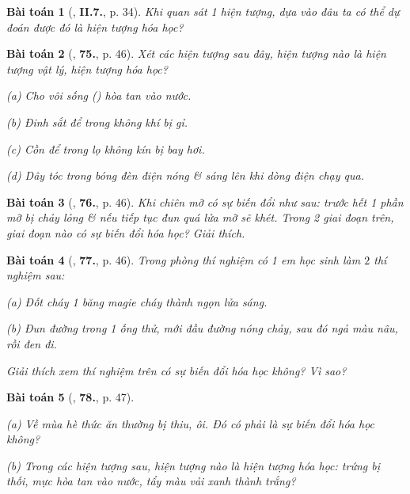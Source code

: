 \documentclass{article}
\numberwithin{equation}{section}
\newtheorem{baitoan}{Bài toán}
\begin{document}
\begin{baitoan}[\cite{Truong2021}, \textbf{II.7.}, p. 34]
	Khi quan sát 1 hiện tượng, dựa vào đâu ta có thể dự đoán được đó là hiện tượng hóa học?
\end{baitoan}

\begin{baitoan}[\cite{An_400_BT_Hoa_Hoc_8_2020}, \textbf{75.}, p. 46]
	Xét các hiện tượng sau đây, hiện tượng nào là hiện tượng vật lý, hiện tượng hóa học?
	\begin{enumerate*}
		\item[(a)] Cho vôi sống () hòa tan vào nước.
		\item[(b)] Đinh sắt để trong không khí bị gỉ.
		\item[(c)] Cồn để trong lọ không kín bị bay hơi.
		\item[(d)] Dây tóc trong bóng đèn điện nóng \& sáng lên khi dòng điện chạy qua.
	\end{enumerate*}
\end{baitoan}

\begin{baitoan}[\cite{An_400_BT_Hoa_Hoc_8_2020}, \textbf{76.}, p. 46]
	Khi chiên mỡ có sự biến đổi như sau: trước hết 1 phần mỡ bị chảy lỏng \& nếu tiếp tục đun quá lửa mỡ sẽ khét. Trong 2 giai đoạn trên, giai đoạn nào có sự biến đổi hóa học? Giải thích.
\end{baitoan}

\begin{baitoan}[\cite{An_400_BT_Hoa_Hoc_8_2020}, \textbf{77.}, p. 46]
	Trong phòng thí nghiệm có 1 em học sinh làm $2$ thí nghiệm sau:
	\begin{enumerate*}
		\item[(a)] Đốt cháy 1 băng magie cháy thành ngọn lửa sáng.
		\item[(b)] Đun đường trong 1 ống thử, mới đầu đường nóng chảy, sau đó ngả màu nâu, rồi đen đi.
	\end{enumerate*}
	Giải thích xem thí nghiệm trên có sự biến đổi hóa học không? Vì sao?
\end{baitoan}

\begin{baitoan}[\cite{An_400_BT_Hoa_Hoc_8_2020}, \textbf{78.}, p. 47]
	\begin{enumerate*}
		\item[(a)] Về mùa hè thức ăn thường bị thiu, ôi. Đó có phải là sự biến đổi hóa học không?
		\item[(b)] Trong các hiện tượng sau, hiện tượng nào là hiện tượng hóa học: trứng bị thối, mực hòa tan vào nước, tẩy màu vải xanh thành trắng?
	\end{enumerate*}
\end{baitoan}
\end{document}
